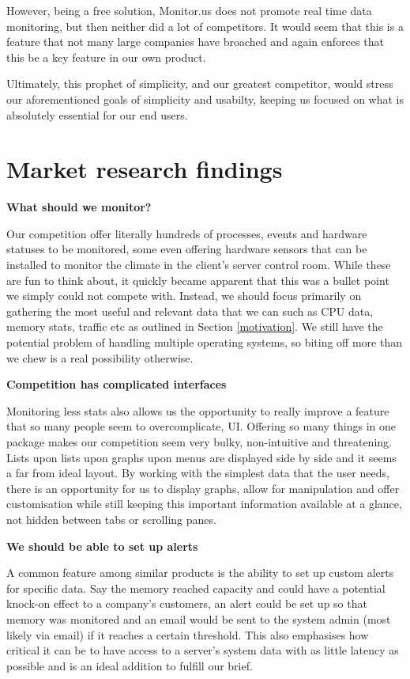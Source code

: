 \documentclass{l3proj}
\begin{document}
However, being a free solution, Monitor.us does not promote real time data monitoring, but then neither did a lot of competitors. It would seem that this is a feature that not many large companies have broached and again enforces that this be a key feature in our own product.

Ultimately, this prophet of simplicity, and our greatest competitor, would stress our aforementioned goals of simplicity and usabilty, keeping us focused on what is absolutely essential for our end users.

\section{Market research findings}

\textbf{What should we monitor?}

Our competition offer literally hundreds of processes, events and hardware statuses to be monitored, some even offering hardware sensors that can be installed to monitor the climate in the client’s server control room. While these are fun to think about, it quickly became apparent that this was a bullet point we simply could not compete with. Instead, we should focus primarily on gathering the most useful and relevant data that we can such as CPU data, memory stats, traffic etc as outlined in Section \ref{motivation}. We still have the potential problem of handling multiple operating systems, so biting off more than we chew is a real possibility otherwise.

\textbf{Competition has complicated interfaces}

Monitoring less stats also allows us the opportunity to really improve a feature that so many people seem to overcomplicate, UI. Offering so many things in one package makes our competition seem very bulky, non-intuitive and threatening. Lists upon lists upon graphs upon menus are displayed side by side and it seems a far from ideal layout. By working with the simplest data that the user needs, there is an opportunity for us to display graphs, allow for manipulation and offer customisation while still keeping this important information available at a glance, not hidden between tabs or scrolling panes.

\textbf{We should be able to set up alerts}

A common feature among similar products is the ability to set up custom alerts for specific data. Say the memory reached capacity and could have a potential knock-on effect to a company’s customers, an alert could be set up so that memory was monitored and an email would be sent to the system admin (most likely via email) if it reaches a certain threshold. This also emphasises how critical it can be to have access to a server’s system data with as little latency as possible and is an ideal addition to fulfill our brief.
\end{document}
